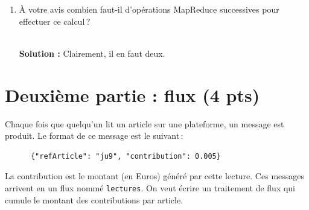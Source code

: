 \documentclass[11pt,a4paper]{article}
\newenvironment{solution}[0]{
~\\ \color{red} \textbf{Solution : }\color{black}}{%
}
\begin{document}
\begin{enumerate}
\begin{enumerate}
\begin{solution}
L'opérateur principal à mettre en œuvre est le \texttt{cogroup}. Le premier
(mais l'ordre n'est pas important) groupe les articles et les auteurs.

\begin{verbatim}
articleEtAuteur = cogroup Articles by ref, Auteurs by refArticle;
\end{verbatim} 

Puis on regroupe la collection obtenue avec la collection des diffusions.


\begin{verbatim}
articlesComplet = cogroup articleEtAuteur by ref, Diffusions by refArticle;
\end{verbatim} 
\end{solution}     

\item À votre avis combien faut-il d'opérations MapReduce successives pour effectuer ce calcul\,?

\begin{solution}
Clairement, il en faut deux.
\end{solution}
    \end{enumerate}
\end{enumerate}

\section*{Deuxième partie : flux (4 pts)}

Chaque fois que quelqu'un lit un article sur une plateforme, un 
message est produit. Le format de ce message est le suivant\,:

  \begin{small}
    \begin{verbatim}
      {"refArticle": "ju9", "contribution": 0.005}
    \end{verbatim}
    \end{small}

La contribution est le montant (en Euros) généré par cette lecture. Ces messages
arrivent en  un flux nommé \texttt{lectures}. 
On veut écrire un traitement de flux qui cumule le montant des contributions par article. 
\end{document}
